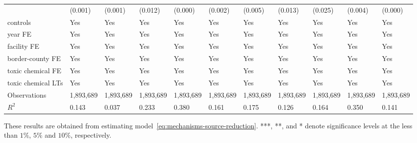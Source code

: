 \begin{table}[H]
{\begin{tabular}{@{}lllllllllll@{}}
            & (0.001)       & (0.001)       & (0.012)        & (0.000)      & (0.002)        & (0.005)   & (0.013)                      & (0.025)          & (0.004)               & (0.000)          \\
            controls           & Yes           & Yes           & Yes            & Yes          & Yes            & Yes       & Yes                          & Yes              & Yes                   & Yes              \\
            year FE            & Yes           & Yes           & Yes            & Yes          & Yes            & Yes       & Yes                          & Yes              & Yes                   & Yes              \\
            facility FE        & Yes           & Yes           & Yes            & Yes          & Yes            & Yes       & Yes                          & Yes              & Yes                   & Yes              \\
            border-county FE   & Yes           & Yes           & Yes            & Yes          & Yes            & Yes       & Yes                          & Yes              & Yes                   & Yes              \\
            toxic chemical FE  & Yes           & Yes           & Yes            & Yes          & Yes            & Yes       & Yes                          & Yes              & Yes                   & Yes              \\
            toxic chemical LTs & Yes           & Yes           & Yes            & Yes          & Yes            & Yes       & Yes                          & Yes              & Yes                   & Yes              \\\midrule
            Observations       & 1,893,689     & 1,893,689     & 1,893,689      & 1,893,689    & 1,893,689      & 1,893,689 & 1,893,689                    & 1,893,689        & 1,893,689             & 1,893,689        \\
            $R^2$              & 0.143         & 0.037         & 0.233          & 0.380        & 0.161          & 0.175     & 0.126                        & 0.164            & 0.350                 & 0.141            \\ \bottomrule \bottomrule
        \end{tabular}%
    }
    \begin{minipage}{18cm}
        \vspace{0.05in}
        These results are obtained from estimating model~\ref{eq:mechanisms-source-reduction}. ***, **, and * denote significance levels at the less than $1\%$, $5\%$ and $10\%$, respectively.
    \end{minipage}
\end{table}